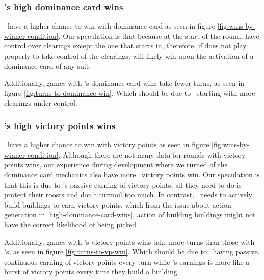 \subsubsection{\Marquise's high dominance card wins}
\Marquise \ have a higher chance to win with dominance card as seen in figure \ref{fig:wins-by-winner-condition}. Our speculation is that because at the start of the round, \Marquise{} have control over clearings except the one that \Eyrie{} starts in, therefore, if \Eyrie{} does not play properly to take control of the clearings, \Marquise{} will likely win upon the activation of a dominance card of any suit.

Additionally, games with \Marquise's dominance card wins take fewer turns, as seen in figure \ref{fig:turns-to-dominance-win}. Which should be due to \Marquise \ starting with more clearings under control.

\subsubsection{\Eyrie's high victory points wins}
\Eyrie \ have a higher chance to win with victory points as seen in figure \ref{fig:wins-by-winner-condition}. Although there are not many data for rounds with victory points wins, our experience during development where we turned of the dominance card mechanics also have more \Eyrie \ victory points win. Our speculation is that this is due to \Eyrie's passive earning of victory points, all they need to do is protect their roosts and don't turmoil too much. In contrast, \Marquise \ needs to actively build buildings to earn victory points, which from the issue about action generation in \ref{high-dominance-card-wins}, action of building buildings might not have the correct likelihood of being picked.

Additionally, games with \Eyrie's victory points wins take more turns than those with \Marquise's, as seen in figure \ref{fig:turns-to-vp-win}. Which should be due to \Eyrie \ having passive, continuous earning of victory points every turn while \Marquise's earnings is more like a burst of victory points every time they build a building.



